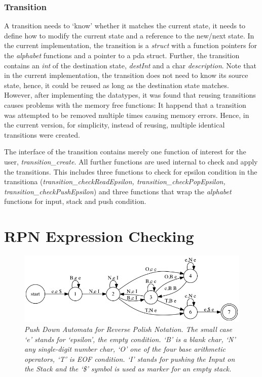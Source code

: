 \documentclass[a4paper,11pt,twoside]{article}
\begin{document}
\subsubsection{Transition}
A transition needs to `know' whether it matches the current
state, it needs to define how to modify the current state and a
reference to the new/next state. In the current implementation, the
transition is a \textit{struct} with a function pointers for the
\textit{alphabet} functions and a pointer to a pda struct. Further,
the transition contains an \textit{int} of the destination state,
\textit{destInt} and a char \textit{description}. Note that in the
current implementation, the transition does not need to know its
source state, hence, it could be reused as long as the destination
state matches. However, after implementing the datatypes, it was found
that reusing transitions causes problems with the memory free
functions: It happend that a transition was attempted to be removed
multiple times causing memory errors. Hence, in the current version,
for simplicity, instead of reusing, multiple identical transitions
were created. 
  
The interface of the transition contains merely one function of
interest for the user, \textit{transition\_create}. All further
functions are used internal to check and apply the transitions. This
includes three functions to check for epsilon condition in the
transitiona (\textit{transition\_checkReadEpsilon,
  transition\_checkPopEpsilon, transition\_checkPushEpsilon}) and three
functions that wrap the \textit{alphabet} functions for input, stack
and push condition. 

\section{RPN Expression Checking}

\begin{figure}
 \centering
  \includegraphics[width=\textwidth]{pda}
  \caption{\textit{Push Down Automata for Reverse Polish Notation. The small
    case `e' stands for `epsilon', the empty condition. `B' is a blank
  char, `N' any single-digit number char, `O' one of the four base
  arithmetic operators, `T' is EOF condition. `I' stands for pushing
  the Input on the Stack and the `\$' symbol is   used as marker for
  an empty stack.}} 
  \label{fig:rpn}
\end{figure}
\end{document}
